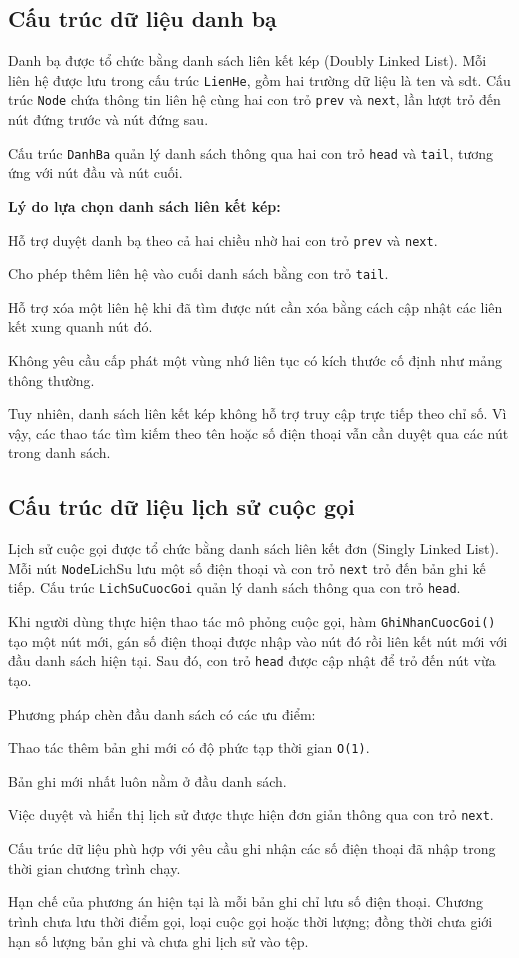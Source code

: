 \documentclass[12pt,a4paper]{report}
\begin{document}
\subsection{Cấu trúc dữ liệu danh bạ}

Danh bạ được tổ chức bằng danh sách liên kết kép (Doubly Linked List). Mỗi liên hệ được lưu trong cấu trúc \texttt{LienHe}, gồm hai trường dữ liệu là ten và sdt. Cấu trúc \texttt{Node} chứa thông tin liên hệ cùng hai con trỏ \texttt{prev} và \texttt{next}, lần lượt trỏ đến nút đứng trước và nút đứng sau.\par
Cấu trúc \texttt{DanhBa} quản lý danh sách thông qua hai con trỏ \texttt{head} và \texttt{tail}, tương ứng với nút đầu và nút cuối.\par
\noindent\textbf{Lý do lựa chọn danh sách liên kết kép:} \par
Hỗ trợ duyệt danh bạ theo cả hai chiều nhờ hai con trỏ \texttt{prev} và \texttt{next}.\par
Cho phép thêm liên hệ vào cuối danh sách bằng con trỏ \texttt{tail}.\par
Hỗ trợ xóa một liên hệ khi đã tìm được nút cần xóa bằng cách cập nhật các liên kết xung quanh nút đó.\par
Không yêu cầu cấp phát một vùng nhớ liên tục có kích thước cố định như mảng thông thường.\par
Tuy nhiên, danh sách liên kết kép không hỗ trợ truy cập trực tiếp theo chỉ số. Vì vậy, các thao tác tìm kiếm theo tên hoặc số điện thoại vẫn cần duyệt qua các nút trong danh sách.\par
\subsection{Cấu trúc dữ liệu lịch sử cuộc gọi}

Lịch sử cuộc gọi được tổ chức bằng danh sách liên kết đơn (Singly Linked List). Mỗi nút \texttt{Node}LichSu lưu một số điện thoại và con trỏ \texttt{next} trỏ đến bản ghi kế tiếp. Cấu trúc \texttt{LichSuCuocGoi} quản lý danh sách thông qua con trỏ \texttt{head}.\par
Khi người dùng thực hiện thao tác mô phỏng cuộc gọi, hàm \texttt{GhiNhanCuocGoi()} tạo một nút mới, gán số điện thoại được nhập vào nút đó rồi liên kết nút mới với đầu danh sách hiện tại. Sau đó, con trỏ \texttt{head} được cập nhật để trỏ đến nút vừa tạo.\par
Phương pháp chèn đầu danh sách có các ưu điểm:\par
Thao tác thêm bản ghi mới có độ phức tạp thời gian \texttt{O(1)}.\par
Bản ghi mới nhất luôn nằm ở đầu danh sách.\par
Việc duyệt và hiển thị lịch sử được thực hiện đơn giản thông qua con trỏ \texttt{next}.\par
Cấu trúc dữ liệu phù hợp với yêu cầu ghi nhận các số điện thoại đã nhập trong thời gian chương trình chạy.\par
Hạn chế của phương án hiện tại là mỗi bản ghi chỉ lưu số điện thoại. Chương trình chưa lưu thời điểm gọi, loại cuộc gọi hoặc thời lượng; đồng thời chưa giới hạn số lượng bản ghi và chưa ghi lịch sử vào tệp.\par
\end{document}
